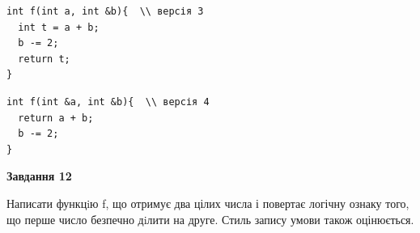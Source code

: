 \documentclass[12pt, ukrainian]{article}
\begin{document}
{\begin {large}
\begin{minipage}[t]{11.0cm}
\vspace{-8mm}\begin{verbatim}
int f(int a, int &b){  \\ версія 3
  int t = a + b;
  b -= 2;
  return t;
}
\end{verbatim}

\vspace{-8mm}\begin{verbatim}
int f(int &a, int &b){  \\ версія 4
  return a + b;
  b -= 2;
}
\end{verbatim}



\begin{center}
\textbf{Завдання 12}
\end{center}

Написати функцiю f, що отримує два цілих числа і повертає логічну ознаку того, що перше число безпечно дiлити на друге. Стиль запису умови також оцінюється.\par

\end{minipage}

\end {large}}
\newpage
\end{document}
